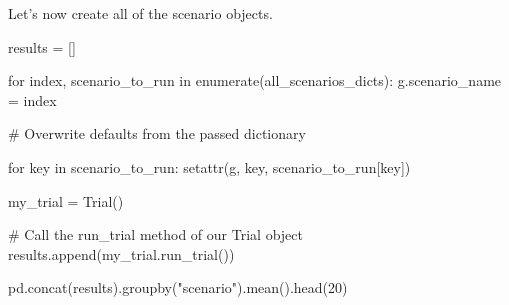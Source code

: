 \documentclass[
  letterpaper,
  DIV=11,
  numbers=noendperiod]{scrreprt}
\newenvironment{Shaded}{\begin{snugshade}}{\end{snugshade}}
\newcommand{\BuiltInTok}[1]{\textcolor[rgb]{0.00,0.23,0.31}{#1}}
\newcommand{\CommentTok}[1]{\textcolor[rgb]{0.37,0.37,0.37}{#1}}
\newcommand{\ControlFlowTok}[1]{\textcolor[rgb]{0.00,0.23,0.31}{#1}}
\newcommand{\DecValTok}[1]{\textcolor[rgb]{0.68,0.00,0.00}{#1}}
\newcommand{\KeywordTok}[1]{\textcolor[rgb]{0.00,0.23,0.31}{#1}}
\newcommand{\NormalTok}[1]{\textcolor[rgb]{0.00,0.23,0.31}{#1}}
\newcommand{\OperatorTok}[1]{\textcolor[rgb]{0.37,0.37,0.37}{#1}}
\newcommand{\StringTok}[1]{\textcolor[rgb]{0.13,0.47,0.30}{#1}}
\begin{document}
Let's now create all of the scenario objects.

\begin{Shaded}
\begin{Highlighting}[]
\NormalTok{results }\OperatorTok{=}\NormalTok{ []}

\ControlFlowTok{for}\NormalTok{ index, scenario\_to\_run }\KeywordTok{in} \BuiltInTok{enumerate}\NormalTok{(all\_scenarios\_dicts):}
\NormalTok{    g.scenario\_name }\OperatorTok{=}\NormalTok{ index}

    \CommentTok{\# Overwrite defaults from the passed dictionary}

    \ControlFlowTok{for}\NormalTok{ key }\KeywordTok{in}\NormalTok{ scenario\_to\_run:}
        \BuiltInTok{setattr}\NormalTok{(g, key, scenario\_to\_run[key])}

\NormalTok{    my\_trial }\OperatorTok{=}\NormalTok{ Trial()}

    \CommentTok{\# Call the run\_trial method of our Trial object}
\NormalTok{    results.append(my\_trial.run\_trial())}

\NormalTok{pd.concat(results).groupby(}\StringTok{"scenario"}\NormalTok{).mean().head(}\DecValTok{20}\NormalTok{)}
\end{Highlighting}
\end{Shaded}
\end{document}
